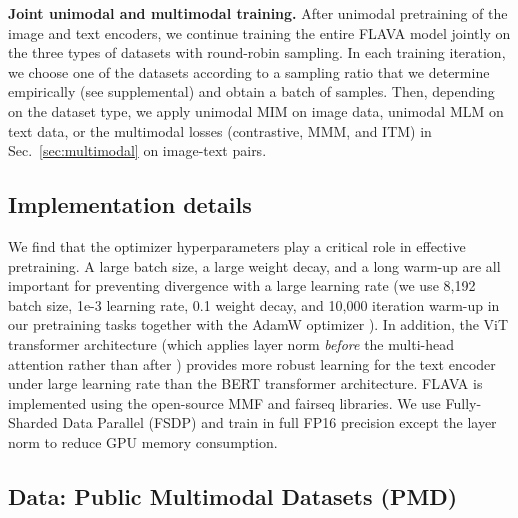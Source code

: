 \documentclass[10pt,twocolumn,letterpaper]{article}
\newcommand{\CMD}{PMD\xspace}
\newcommand{\myparagraph}[1]{\vspace{0.25em}\noindent\textbf{#1}}
\begin{document}
\myparagraph{Joint unimodal and multimodal training.} After unimodal pretraining of the image and text encoders, we continue training the entire FLAVA model jointly on the three types of datasets with round-robin sampling. In each training iteration, we choose one of the datasets according to a sampling ratio that we determine empirically (see supplemental) and obtain a batch of samples. Then, depending on the dataset type, we apply unimodal MIM on image data, unimodal MLM on text data, or the multimodal losses (contrastive, MMM, and ITM) in Sec.~\ref{sec:multimodal} on image-text pairs.

\subsection{Implementation details}
\label{sec:model:insights}

We find that the optimizer hyperparameters play a critical role in effective pretraining. A large batch size, a large weight decay, and a long warm-up are all important for preventing divergence with a large learning rate (we use 8,192 batch size, 1e-3 learning rate, 0.1 weight decay, and 10,000 iteration warm-up in our pretraining tasks together with the AdamW optimizer \cite{loshchilov2019decoupled,kingma2014adam}). In addition, the ViT transformer architecture (which applies layer norm \cite{ba2016layernorm} \emph{before} the multi-head attention rather than after \cite{xiong2020layer}) provides more robust learning for the text encoder under large learning rate than the BERT \cite{devlin2018bert} transformer architecture. FLAVA is implemented using the open-source MMF \cite{singh2020mmf} and fairseq \cite{ott2019fairseq} libraries. We use Fully-Sharded Data Parallel (FSDP) \cite{rajbhandari2019zero,rajbhandari2021zero} and train in full FP16 precision except the layer norm \cite{ba2016layernorm} to reduce GPU memory consumption.

\subsection{Data: Public Multimodal Datasets (\CMD)}
\label{sec:dataset}
\end{document}

